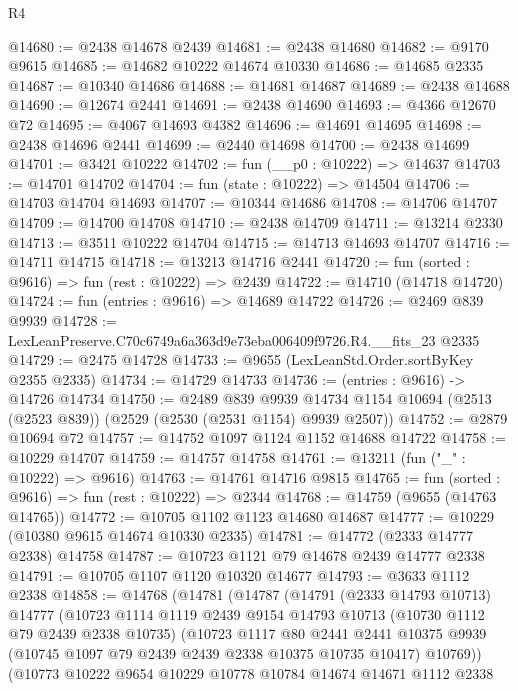 \begin{lexlean}{R4}
\begin{coremodule}
@14680 := @2438 @14678 @2439
@14681 := @2438 @14680
@14682 := @9170 @9615
@14685 := @14682 @10222 @14674 @10330
@14686 := @14685 @2335
@14687 := @10340 @14686
@14688 := @14681 @14687
@14689 := @2438 @14688
@14690 := @12674 @2441
@14691 := @2438 @14690
@14693 := @4366 @12670 @72
@14695 := @4067 @14693 @4382
@14696 := @14691 @14695
@14698 := @2438 @14696 @2441
@14699 := @2440 @14698
@14700 := @2438 @14699
@14701 := @3421 @10222
@14702 := fun (__p0 : @10222) => @14637
@14703 := @14701 @14702
@14704 := fun (state : @10222) => @14504
@14706 := @14703 @14704 @14693
@14707 := @10344 @14686
@14708 := @14706 @14707
@14709 := @14700 @14708
@14710 := @2438 @14709
@14711 := @13214 @2330
@14713 := @3511 @10222 @14704
@14715 := @14713 @14693 @14707
@14716 := @14711 @14715
@14718 := @13213 @14716 @2441
@14720 := fun (sorted : @9616) => fun (rest : @10222) => @2439
@14722 := @14710 (@14718 @14720)
@14724 := fun (entries : @9616) => @14689 @14722
@14726 := @2469 @839 @9939
@14728 := LexLeanPreserve.C70c6749a6a363d9e73eba006409f9726.R4.__fits_23 @2335
@14729 := @2475 @14728
@14733 := @9655 (LexLeanStd.Order.sortByKey @2355 @2335)
@14734 := @14729 @14733
@14736 := (entries : @9616) -> @14726 @14734
@14750 := @2489
    @839
    @9939
    @14734
    @1154
    @10694
    (@2513 (@2523 @839))
    (@2529 (@2530 (@2531 @1154) @9939 @2507))
@14752 := @2879 @10694 @72
@14757 := @14752 @1097 @1124 @1152 @14688 @14722
@14758 := @10229 @14707
@14759 := @14757 @14758
@14761 := @13211 (fun ("_" : @10222) => @9616)
@14763 := @14761 @14716 @9815
@14765 := fun (sorted : @9616) => fun (rest : @10222) => @2344
@14768 := @14759 (@9655 (@14763 @14765))
@14772 := @10705 @1102 @1123 @14680 @14687
@14777 := @10229 (@10380 @9615 @14674 @10330 @2335)
@14781 := @14772 (@2333 @14777 @2338) @14758
@14787 := @10723 @1121 @79 @14678 @2439 @14777 @2338
@14791 := @10705 @1107 @1120 @10320 @14677
@14793 := @3633 @1112 @2338
@14858 := @14768
    (@14781
      (@14787
        (@14791
          (@2333 @14793 @10713)
          @14777
          (@10723
            @1114
            @1119
            @2439
            @9154
            @14793
            @10713
            (@10730 @1112 @79 @2439 @2338 @10735)
            (@10723
              @1117
              @80
              @2441
              @2441
              @10375
              @9939
              (@10745 @1097 @79 @2439 @2439 @2338 @10375 @10735 @10417)
              @10769))
          (@10773
            @10222
            @9654
            @10229
            @10778
            @10784
            @14674
            @14671
            @1112
            @2338

\end{coremodule}
\end{lexlean}
